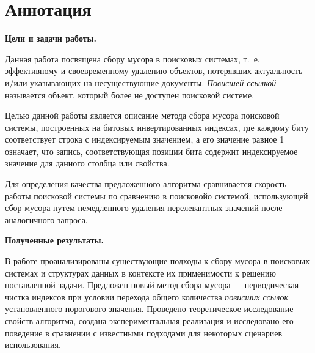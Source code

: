 \newpage
\section*{Аннотация}

\textbf{Цели и задачи работы.}

Данная работа посвящена сбору мусора в поисковых системах, т.~е. эффективному и своевременному
удалению объектов, потерявших актуальность и/или указывающих на несуществующие документы.
\textit{Повисшей ссылкой} называется объект, который более не доступен поисковой системе.

Целью данной работы является описание метода сбора мусора поисковой системы, построенных на
битовых инвертированных индексах, где каждому биту соответствует строка с индексируемым значением,
а его значение равное 1 означает, что запись, соответствующая позиции бита содержит индексируемое
значение для данного столбца или свойства.

Для определения качества предложенного алгоритма сравнивается скорость работы поисковой системы
по сравнению в поисковойо системой, использующей сбор мусора путем немедленного удаления
нерелевантных значений после аналогичного запроса.


\textbf{Полученные результаты.}

В работе проанализированы существующие подходы к сбору мусора в поисковых системах и структурах
данных в контексте их применимости к решению поставленной задачи.
Предложен новый метод сбора мусора --- периодическая чистка индексов при условии перехода общего
количества \textit{повисших ссылок} установленного порогового значения.
Проведено теоретическое исследование свойств алгоритма, создана экспериментальная реализация и
исследовано его поведение в сравнении с известными подходами для некоторых сценариев использования.